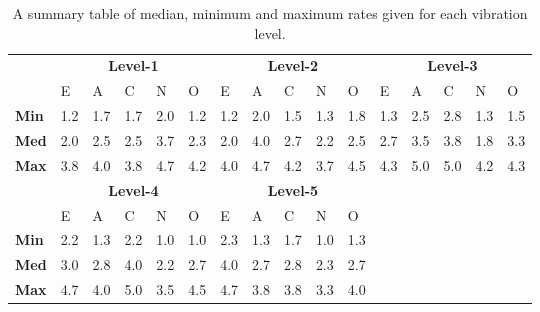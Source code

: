 \begin{table}[H]
    \renewcommand{\arraystretch}{1}
    \begin{center}
        \begin{tabular}{p{}|
        p{}|p{}|p{}|p{}|p{}||
        p{}|p{}|p{}|p{}|p{}||
        p{}|p{}|p{}|p{}|p{}|}
            \cline{2-16}
            & \multicolumn{5}{c||}{\textbf{Level-1}} & \multicolumn{5}{c||}{\textbf{Level-2}}
            & \multicolumn{5}{c|}{\textbf{Level-3}} \\
            \cline{2-16}
            & E & A & C & N & O & E & A & C & N & O & E & A & C & N & O      \\
            \cline{2-16}
            \textbf{Min}    & 1.2 & 1.7 & 1.7 & 2.0 & 1.2 & 1.2 & 2.0 & 1.5 & 1.3 & 1.8 & 1.3 & 2.5 & 2.8 & 1.3 & 1.5  \\
            \textbf{Med}    & 2.0 & 2.5 & 2.5 & 3.7 & 2.3 & 2.0 & 4.0 & 2.7 & 2.2 & 2.5 & 2.7 & 3.5 & 3.8 & 1.8 & 3.3  \\
            \textbf{Max}    & 3.8 & 4.0 & 3.8 & 4.7 & 4.2 & 4.0 & 4.7 & 4.2 & 3.7 & 4.5 & 4.3 & 5.0 & 5.0 & 4.2 & 4.3 \\
            \cline{2-16}
            \cline{2-11}
            &  \multicolumn{5}{|c||}{\textbf{Level-4}} & \multicolumn{5}{|c||}{\textbf{Level-5}} \\
            \cline{2-11}
            & E & A & C & N & O & E & A & C & N & O            \\
            \cline{2-11}
            \textbf{Min}    & 2.2 & 1.3 & 2.2 & 1.0 & 1.0 & 2.3 & 1.3 & 1.7 & 1.0 & 1.3    \\
            \textbf{Med}    & 3.0 & 2.8 & 4.0 & 2.2 & 2.7 & 4.0 & 2.7 & 2.8 & 2.3 & 2.7    \\
            \textbf{Max}    & 4.7 & 4.0 & 5.0 & 3.5 & 4.5 & 4.7 & 3.8 & 3.8 & 3.3 & 4.0    \\
            \cline{2-11}
        \end{tabular}
        \caption[]{A summary table of median, minimum and maximum rates given for each vibration level.\footnotemark}
        \label{table:medianMM2}
    \end{center}
\end{table}

